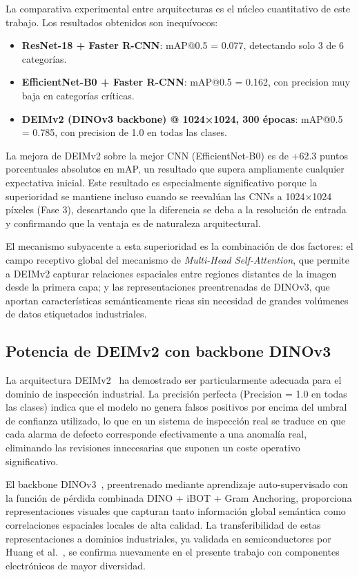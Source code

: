 La comparativa experimental entre arquitecturas es el núcleo cuantitativo de este trabajo. Los resultados obtenidos son inequívocos:

\begin{itemize}
    \item \textbf{ResNet-18 + Faster R-CNN}: mAP@0.5 = 0.077, detectando solo 3 de 6 categorías.
    \item \textbf{EfficientNet-B0 + Faster R-CNN}: mAP@0.5 = 0.162, con precision muy baja en categorías críticas.
    \item \textbf{DEIMv2 (DINOv3 backbone) @ 1024×1024, 300 épocas}: mAP@0.5 = 0.785, con precision de 1.0 en todas las clases.
\end{itemize}

La mejora de DEIMv2 sobre la mejor CNN (EfficientNet-B0) es de +62.3 puntos porcentuales absolutos en mAP, un resultado que supera ampliamente cualquier expectativa inicial. Este resultado es especialmente significativo porque la superioridad se mantiene incluso cuando se reevalúan las CNNs a 1024×1024 píxeles (Fase 3), descartando que la diferencia se deba a la resolución de entrada y confirmando que la ventaja es de naturaleza arquitectural.

El mecanismo subyacente a esta superioridad es la combinación de dos factores: el campo receptivo global del mecanismo de \textit{Multi-Head Self-Attention}, que permite a DEIMv2 capturar relaciones espaciales entre regiones distantes de la imagen desde la primera capa; y las representaciones preentrenadas de \acrshort{DINOv3}, que aportan características semánticamente ricas sin necesidad de grandes volúmenes de datos etiquetados industriales.

\subsection{Potencia de DEIMv2 con backbone DINOv3}

La arquitectura DEIMv2~\cite{huang2025deimv2} ha demostrado ser particularmente adecuada para el dominio de inspección industrial. La precisión perfecta (Precision = 1.0 en todas las clases) indica que el modelo no genera falsos positivos por encima del umbral de confianza utilizado, lo que en un sistema de inspección real se traduce en que cada alarma de defecto corresponde efectivamente a una anomalía real, eliminando las revisiones innecesarias que suponen un coste operativo significativo.

El backbone \acrshort{DINOv3}~\cite{simeoni2025dinov3}, preentrenado mediante aprendizaje auto-supervisado con la función de pérdida combinada DINO + iBOT + Gram Anchoring, proporciona representaciones visuales que capturan tanto información global semántica como correlaciones espaciales locales de alta calidad. La transferibilidad de estas representaciones a dominios industriales, ya validada en semiconductores por Huang et al.~\cite{huang2025semiconductor}, se confirma nuevamente en el presente trabajo con componentes electrónicos de mayor diversidad.

